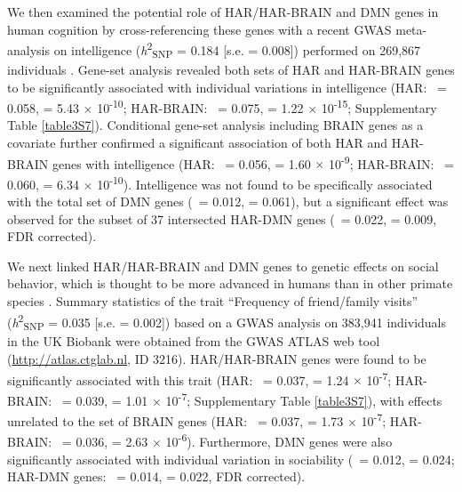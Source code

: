 \begin{refsection}
We then examined the potential role of HAR/HAR-BRAIN and DMN genes in human cognition by cross-referencing these genes with a recent GWAS meta-analysis on intelligence (\textit{h}\textsuperscript{2}\textsubscript{SNP} = 0.184 [s.e. = 0.008]) performed on 269,867 individuals \citep{Savage2018GenomewideAM}. Gene-set analysis \citep{de2015magma} revealed both sets of HAR and HAR-BRAIN genes to be significantly associated with individual variations in intelligence (HAR: \textbeta\ = 0.058, \pval = 5.43 $\times$ 10\textsuperscript{-10}; HAR-BRAIN: \textbeta\ = 0.075, \pval = 1.22 $\times$ 10\textsuperscript{-15}; Supplementary Table \ref{table3S7}). Conditional gene-set analysis \citep{de2018conditional} including BRAIN genes as a covariate further confirmed a significant association of both HAR and HAR-BRAIN genes with intelligence (HAR: \textbeta\ = 0.056, \pval = 1.60 $\times$ 10\textsuperscript{-9}; HAR-BRAIN: \textbeta\ = 0.060, \pval = 6.34 $\times$ 10\textsuperscript{-10}). Intelligence was not found to be specifically associated with the total set of DMN genes (\textbeta\ = 0.012, \pval = 0.061), but a significant effect was observed for the subset of 37 intersected HAR-DMN genes (\textbeta\ = 0.022, \pval = 0.009, FDR corrected).

We next linked HAR/HAR-BRAIN and DMN genes to genetic effects on social behavior, which is thought to be more advanced in humans than in other primate species \citep{tomasello2010ape}. Summary statistics of the trait “Frequency of friend/family visits” (\textit{h}\textsuperscript{2}\textsubscript{SNP} = 0.035 [s.e. = 0.002]) based on a GWAS analysis on 383,941 individuals in the UK Biobank were obtained from the GWAS ATLAS web tool \citep{Watanabe2019AGO} (\url{http://atlas.ctglab.nl}, ID 3216). HAR/HAR-BRAIN genes were found to be significantly associated with this trait (HAR: \textbeta\ = 0.037, \pval = 1.24 $\times$ 10\textsuperscript{-7}; HAR-BRAIN: \textbeta\ = 0.039, \pval = 1.01 $\times$ 10\textsuperscript{-7}; Supplementary Table \ref{table3S7}), with effects unrelated to the set of BRAIN genes (HAR: \textbeta\ = 0.037, \pval = 1.73 $\times$ 10\textsuperscript{-7}; HAR-BRAIN: \textbeta\ = 0.036, \pval = 2.63 $\times$ 10\textsuperscript{-6}). Furthermore, DMN genes were also significantly associated with individual variation in sociability (\textbeta\ = 0.012, \pval = 0.024; HAR-DMN genes: \textbeta\ = 0.014, \pval = 0.022, FDR corrected).


\end{refsection}
